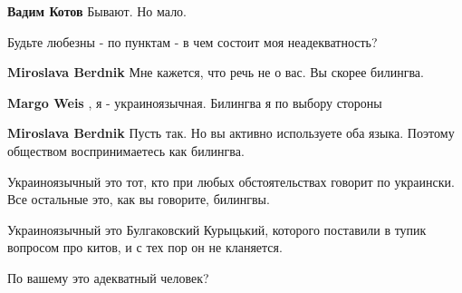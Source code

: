 \begin{itemize}
\begin{itemize}
\textbf{Вадим Котов} Бывают. Но мало.


 
Будьте любезны - по пунктам - в чем состоит моя неадекватность?

 
\textbf{Miroslava Berdnik} Мне кажется, что речь не о вас. Вы скорее билингва.


 
\textbf{Margo Weis} , я - украиноязычная. Билингва я по выбору стороны

 
\textbf{Miroslava Berdnik} Пусть так. Но вы активно используете оба языка. Поэтому обществом воспринимаетесь как билингва.

 

Украиноязычный это тот, кто при любых обстоятельствах говорит по украински. Все
остальные это, как вы говорите, билингвы.

Украиноязычный это Булгаковский Курыцький, которого поставили в тупик вопросом
про китов, и с тех пор он не кланяется.

По вашему это адекватный человек?



 


\end{itemize}
\end{itemize}
